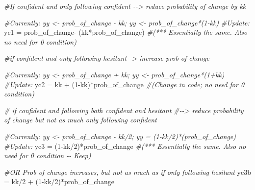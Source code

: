 \documentclass[
]{article}
\newenvironment{Shaded}{\begin{snugshade}}{\end{snugshade}}
\newcommand{\CommentTok}[1]{\textcolor[rgb]{0.56,0.35,0.01}{\textit{#1}}}
\newcommand{\DecValTok}[1]{\textcolor[rgb]{0.00,0.00,0.81}{#1}}
\newcommand{\NormalTok}[1]{#1}
\newcommand{\OtherTok}[1]{\textcolor[rgb]{0.56,0.35,0.01}{#1}}
\newcommand{\SpecialCharTok}[1]{\textcolor[rgb]{0.00,0.00,0.00}{#1}}
\begin{document}
\begin{Shaded}
\begin{Highlighting}[]
\CommentTok{\#If confident and only following confident {-}{-}\textgreater{} reduce probability of change by kk}

\CommentTok{\#Currently: yy \textless{}{-} prob\_of\_change {-} kk; yy \textless{}{-} prob\_of\_change*(1{-}kk)}
\CommentTok{\#Update:}
\NormalTok{yc1 }\OtherTok{=}\NormalTok{ prob\_of\_change}\SpecialCharTok{{-}}\NormalTok{ (kk}\SpecialCharTok{*}\NormalTok{prob\_of\_change) }\CommentTok{\#(*** Essentially the same. Also no need for 0 condition)}

\CommentTok{\#if confident and only following hesitant {-}\textgreater{} increase prob of change}

\CommentTok{\#Currently: yy \textless{}{-} prob\_of\_change + kk; yy \textless{}{-} prob\_of\_change*(1+kk)}
\CommentTok{\#Update:}
\NormalTok{yc2 }\OtherTok{=}\NormalTok{ kk }\SpecialCharTok{+}\NormalTok{ (}\DecValTok{1}\SpecialCharTok{{-}}\NormalTok{kk)}\SpecialCharTok{*}\NormalTok{prob\_of\_change }\CommentTok{\#(Change in code; no need for 0 condition)}

\CommentTok{\# if confident and following both confident and hesitant }
    \CommentTok{\#{-}{-}\textgreater{} reduce probability of change but not as much only following confident}
   
\CommentTok{\#Currently: yy \textless{}{-} prob\_of\_change {-} kk/2; yy = (1{-}kk/2)*(prob\_of\_change)}
\CommentTok{\#Update:}
\NormalTok{yc3 }\OtherTok{=}\NormalTok{ (}\DecValTok{1}\SpecialCharTok{{-}}\NormalTok{kk}\SpecialCharTok{/}\DecValTok{2}\NormalTok{)}\SpecialCharTok{*}\NormalTok{prob\_of\_change }\CommentTok{\#(*** Essentially the same. Also no need for 0 condition {-}{-} Keep)}

    \CommentTok{\#OR Prob of change increases, but not as much as if only following hesitant}
\NormalTok{yc3b }\OtherTok{=}\NormalTok{ kk}\SpecialCharTok{/}\DecValTok{2} \SpecialCharTok{+}\NormalTok{ (}\DecValTok{1}\SpecialCharTok{{-}}\NormalTok{kk}\SpecialCharTok{/}\DecValTok{2}\NormalTok{)}\SpecialCharTok{*}\NormalTok{prob\_of\_change}



\end{Highlighting}
\end{Shaded}
\end{document}
